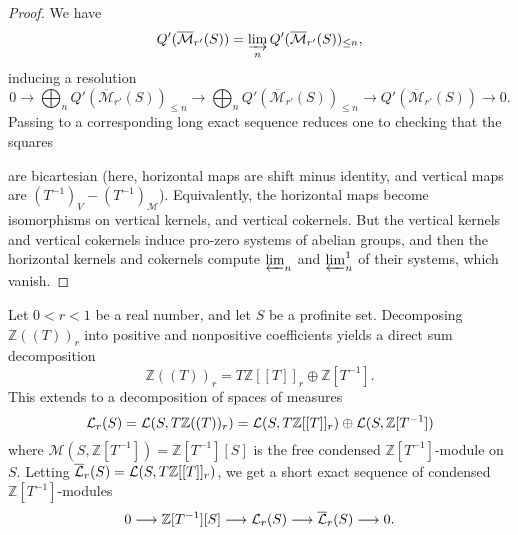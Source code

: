 \begin{proof}
  \leanok
  We have
  \[ Q'(\overline{\mathcal M}_{r'}(S)) = \varinjlim_n Q'(\overline{\mathcal M}_{r'}(S))_{\leq n}, \]
  inducing a resolution
  \[ 0\to \bigoplus_n Q'(\overline{\mathcal M}_{r'}(S))_{\leq n}\to \bigoplus_n Q'(\overline{\mathcal M}_{r'}(S))_{\leq n}\to Q'(\overline{\mathcal M}_{r'}(S))\to 0.  \]
  Passing to a corresponding long exact sequence reduces one to checking that the squares
  \begin{center}
  \end{center}
  are bicartesian (here, horizontal maps are shift minus identity, and vertical maps are $(T^{-1})_V - (T^{-1})_{\mathcal M}$).
  Equivalently, the horizontal maps become isomorphisms on vertical kernels, and vertical cokernels.
  But the vertical kernels and vertical cokernels induce pro-zero systems of abelian groups,
  and then the horizontal kernels and cokernels compute $\varprojlim_n$ and $\varprojlim_n^1$ of their systems, which vanish.
\end{proof}

\begin{proposition}
  \label{Lbar-ses}
  \leanok
  Let $0 < r < 1$ be a real number, and let $S$ be a profinite set.
  Decomposing $\mathbb Z((T))_r$ into positive and nonpositive coefficients yields a direct sum decomposition
  \[ \mathbb Z((T))_r = T\mathbb Z[[T]]_r \oplus \mathbb Z[T^{-1}]. \]
  This extends to a decomposition of spaces of measures
  \[ \mathcal L_r(S) = \mathcal L(S,T\mathbb Z((T))_r) = \mathcal L(S,T\mathbb Z[[T]]_r) \oplus \mathcal L(S,\mathbb Z[T^{-1}]) \]
  where $\mathcal M(S,\mathbb Z[T^{-1}]) = \mathbb Z[T^{-1}][S]$ is the free condensed $\mathbb Z[T^{-1}]$-module on $S$.
  Letting $\overline{\mathcal L}_r(S)= \mathcal L(S,T\mathbb Z[[T]]_r)$, we get a short exact sequence of condensed $\mathbb Z[T^{-1}]$-modules
  \[ 0 \longrightarrow \mathbb Z[T^{-1}][S] \longrightarrow \mathcal L_r(S) \longrightarrow \overline{\mathcal L}_r(S) \longrightarrow 0. \]
\end{proposition}

